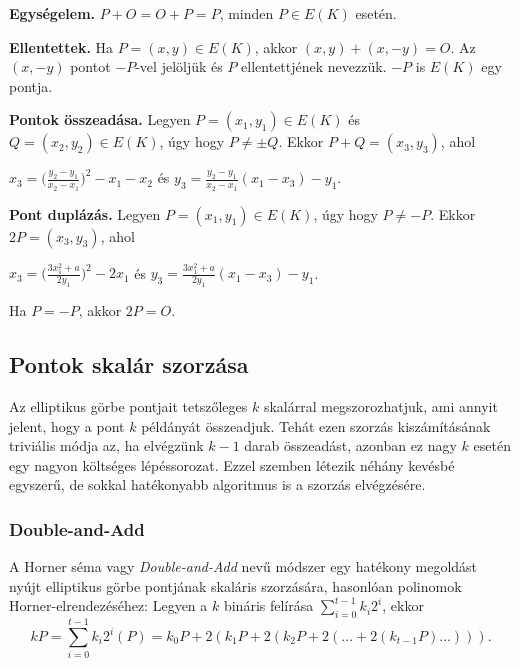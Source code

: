 \begin{outdentlist}
    \item[]
    \textbf{Egységelem.} $P + O = O + P = P$, minden $P \in E(K)$ esetén.

    \item[]
    \textbf{Ellentettek.} Ha $P = (x, y) \in E(K)$, akkor $(x, y) + (x, -y) = O$. Az $(x, -y)$ pontot $-P$-vel jelöljük és $P$ ellentettjének nevezzük. $-P$ is $E(K)$ egy pontja.

    \item[]
    \textbf{Pontok összeadása.} Legyen $P = (x_1, y_1) \in E(K)$ és $Q = (x_2, y_2) \in E(K)$, úgy hogy $P \neq \pm Q$. Ekkor $P + Q = (x_3, y_3)$, ahol 
    \begin{center}$x_3 = \big(\frac{y_2 - y_1}{x_2 - x_1}\big)^2 - x_1 - x_2$ és $y_3 = \frac{y_2 - y_1}{x_2 - x_1}(x_1 - x_3) - y_1$.\end{center}

    \item[]
    \textbf{Pont duplázás.} Legyen $P = (x_1, y_1) \in E(K)$, úgy hogy $P \neq -P$. Ekkor $2P = (x_3, y_3)$, ahol
    \begin{center}$x_3 = \big(\frac{3x_1^2 + a}{2y_1}\big)^2 - 2x_1$ és $y_3 = \frac{3x_1^2 + a}{2y_1}(x_1 - x_3) - y_1$.\end{center} Ha $P = -P$, akkor $2P = O$.
\end{outdentlist}

\subsection{Pontok skalár szorzása}

Az elliptikus görbe pontjait tetszőleges $k$ skalárral megszorozhatjuk, ami annyit jelent, hogy a pont $k$ példányát összeadjuk. Tehát ezen szorzás kiszámításának triviális módja az, ha elvégzünk $k - 1$ darab összeadást, azonban ez nagy $k$ esetén egy nagyon költséges lépéssorozat. Ezzel szemben létezik néhány kevésbé egyszerű, de sokkal hatékonyabb algoritmus is a szorzás elvégzésére.

\subsubsection{Double-and-Add}

A Horner séma \cite{Horner::HornerScheme} vagy \textit{Double-and-Add} nevű módszer egy hatékony megoldást nyújt elliptikus görbe pontjának skaláris szorzására, hasonlóan polinomok Horner-elrendezéséhez: Legyen a $k$ bináris felírása $\sum\limits_{i = 0}^{t-1} k_i 2^i$, ekkor $$kP = \sum_{i = 0}^{t-1} k_i 2^i(P) = k_0P + 2(k_1P + 2(k_2P + 2(... + 2(k_{t-1}P)...))).$$

